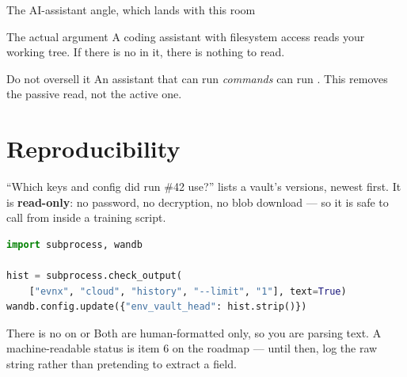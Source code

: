\documentclass[aspectratio=169,10pt]{beamer}
\begin{document}
\begin{frame}[fragile]{The AI-assistant angle, which lands with this room}
  \begin{block}{The actual argument}
    A coding assistant with filesystem access reads your working tree. If
    there is no  in it, there is nothing to read.
  \end{block}

  \vspace{0.6em}
  \begin{center}\large{}\end{center}

  \vspace{0.8em}
  \begin{trap}{Do not oversell it}
    An assistant that can run \emph{commands} can run .
    This removes the passive read, not the active one.
  \end{trap}
\end{frame}

\section{Reproducibility}

\begin{frame}[fragile]{``Which keys and config did run \#42 use?''}
   lists a vault's versions, newest first. It is
  \textbf{read-only}: no password, no decryption, no blob download --- so it is
  safe to call from inside a training script.

  \vspace{0.7em}
\begin{lstlisting}[style=evnxcode,language=Python]
import subprocess, wandb

hist = subprocess.check_output(
    ["evnx", "cloud", "history", "--limit", "1"], text=True)
wandb.config.update({"env_vault_head": hist.strip()})
\end{lstlisting}

  \vspace{0.5em}
  \begin{trap}{There is no  on  or }
    Both are human-formatted only, so you are parsing text. A machine-readable
    status is item 6 on the roadmap --- until then, log the raw string rather
    than pretending to extract a field.
  \end{trap}
\end{frame}
\end{document}
